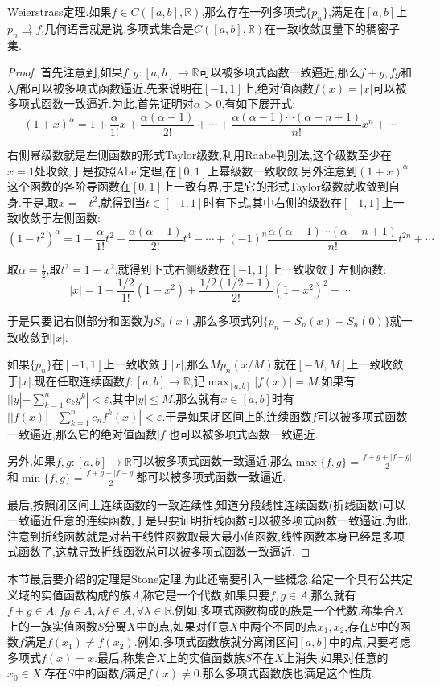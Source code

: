 Weierstrass定理.如果$f\in C([a,b],\mathbb{R})$,那么存在一列多项式$\{p_n\}$,满足在$[a,b]$上$p_n\rightrightarrows f$.几何语言就是说,多项式集合是$C([a,b],\mathbb{R})$在一致收敛度量下的稠密子集.
\begin{proof}
	
	首先注意到,如果$f,g:[a,b]\to\mathbb{R}$可以被多项式函数一致逼近,那么$f+g,fg$和$\lambda f$都可以被多项式函数逼近.先来说明在$[-1,1]$上,绝对值函数$f(x)=|x|$可以被多项式函数一致逼近.为此,首先证明对$\alpha>0$,有如下展开式:$$(1+x)^{\alpha}=1+\frac{\alpha}{1!}x+\frac{\alpha(\alpha-1)}{2!}+\cdots+\frac{\alpha(\alpha-1)\cdots(\alpha-n+1)}{n!}x^n+\cdots$$
	
	右侧幂级数就是左侧函数的形式Taylor级数,利用Raabe判别法,这个级数至少在$x=1$处收敛,于是按照Abel定理,在$[0,1]$上幂级数一致收敛.另外注意到$(1+x)^{\alpha}$这个函数的各阶导函数在$[0,1]$上一致有界,于是它的形式Taylor级数就收敛到自身.于是,取$x=-t^2$,就得到当$t\in[-1,1]$时有下式,其中右侧的级数在$[-1,1]$上一致收敛于左侧函数:
	$$(1-t^2)^{\alpha}=1+\frac{\alpha}{1!}t^2+\frac{\alpha(\alpha-1)}{2!}t^4-\cdots+(-1)^n\frac{\alpha(\alpha-1)\cdots(\alpha-n+1)}{n!}t^{2n}+\cdots$$
	
	取$\alpha=\frac{1}{2}$,取$t^2=1-x^2$,就得到下式右侧级数在$[-1,1]$上一致收敛于左侧函数:
	$$|x|=1-\frac{1/2}{1!}(1-x^2)+\frac{1/2(1/2-1)}{2!}(1-x^2)^2-\cdots$$
	
	于是只要记右侧部分和函数为$S_n(x)$,那么多项式列$\{p_n=S_n(x)-S_n(0)\}$就一致收敛到$|x|$.
	
	如果$\{p_n\}$在$[-1,1]$上一致收敛于$|x|$,那么$Mp_n(x/M)$就在$[-M,M]$上一致收敛于$|x|$.现在任取连续函数$f:[a,b]\to\mathbb{R}$,记$\max_{[a,b]}|f(x)|=M$.如果有$||y|-\sum_{k=1}^nc_ky^k|<\varepsilon$,其中$|y|\le M$,那么就有$x\in[a,b]$时有$||f(x)|-\sum_{k=1}^{n}c_nf^k(x)|<\varepsilon$.于是如果闭区间上的连续函数$f$可以被多项式函数一致逼近,那么它的绝对值函数$|f|$也可以被多项式函数一致逼近.
	
	另外,如果$f,g:[a,b]\to\mathbb{R}$可以被多项式函数一致逼近,那么$\max\{f,g\}=\frac{f+g+|f-g|}{2}$和$\min\{f,g\}=\frac{f+g-|f-g|}{2}$都可以被多项式函数一致逼近.
	
	最后,按照闭区间上连续函数的一致连续性,知道分段线性连续函数(折线函数)可以一致逼近任意的连续函数,于是只要证明折线函数可以被多项式函数一致逼近.为此,注意到折线函数就是对若干线性函数取最大最小值函数,线性函数本身已经是多项式函数了,这就导致折线函数总可以被多项式函数一致逼近.
	
\end{proof}

本节最后要介绍的定理是Stone定理,为此还需要引入一些概念.给定一个具有公共定义域的实值函数构成的族$A$,称它是一个代数,如果只要$f,g\in A$,那么就有$f+g\in A,fg\in A,\lambda f\in A,\forall \lambda\in\mathbb{R}$.例如,多项式函数构成的族是一个代数.称集合$X$上的一族实值函数$S$分离$X$中的点,如果对任意$X$中两个不同的点$x_1,x_2$,存在$S$中的函数$f$满足$f(x_1)\not=f(x_2)$.例如,多项式函数族就分离闭区间$[a,b]$中的点,只要考虑多项式$f(x)=x$.最后,称集合$X$上的实值函数族$S$不在$X$上消失,如果对任意的$x_0\in X$,存在$S$中的函数$f$满足$f(x)\not=0$.那么多项式函数族也满足这个性质.

